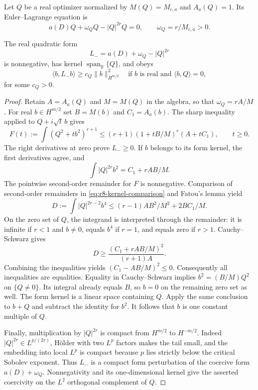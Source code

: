 Let $Q$ be a real optimizer normalized by $M(Q)=M_{c,a}$ and
$A_a(Q)=1$. Its Euler--Lagrange equation is
\[
 a(D)Q+\omega_QQ-|Q|^{2r}Q=0,\qquad
 \omega_Q=r/M_{c,a}>0.
\]

\begin{lemma}\label{lem:r8-phase-coercivity}
The real quadratic form
\[
 L_-=a(D)+\omega_Q-|Q|^{2r}
\]
is nonnegative, has kernel $\operatorname{span}_{\mathbb R}\{Q\}$,
and obeys
\[
 \langle b,L_-b\rangle\ge c_Q\|b\|_{H^{m/2}}^2
 \quad\text{if }b\text{ is real and }\langle b,Q\rangle=0,
\]
for some $c_Q>0$.
\end{lemma}
\begin{proof}
Retain $A=A_a(Q)$ and $M=M(Q)$ in the algebra, so that
$\omega_Q=rA/M$. For real $b\in H^{m/2}$ set
$B=M(b)$ and $C_1=A_a(b)$.
The sharp inequality applied to $Q+i\sqrt t\,b$ gives
\begin{equation}\label{eq:r8-kernel-comparison}
 F(t):=\int(Q^2+tb^2)^{r+1}
 \le(r+1)(1+tB/M)^r(A+tC_1),\qquad t\ge0.
\end{equation}
The right derivatives at zero prove $L_-\ge0$.
If $b$ belongs to its form kernel, the first derivatives agree, and
\[
 \int |Q|^{2r}b^2=C_1+rAB/M.
\]
The pointwise second-order remainder for $F$ is nonnegative.
Comparison of second-order remainders in
\eqref{eq:r8-kernel-comparison} and Fatou's lemma yield
\[
 D:=\int |Q|^{2r-2}b^4
 \le(r-1)AB^2/M^2+2BC_1/M.
\]
On the zero set of $Q$, the integrand is interpreted through
the remainder: it is infinite if $r<1$ and $b\ne0$, equals $b^4$
if $r=1$, and equals zero if $r>1$.
Cauchy--Schwarz gives
\[
 D\ge\frac{(C_1+rAB/M)^2}{(r+1)A}.
\]
Combining the inequalities yields
$(C_1-AB/M)^2\le0$. Consequently all inequalities are equalities.
Equality in Cauchy--Schwarz implies
$b^2=(B/M)Q^2$ on $\{Q\ne0\}$. Its integral already equals $B$,
so $b=0$ on the remaining zero set as well.
The form kernel is a linear space containing $Q$. Apply the same
conclusion to $b+Q$ and subtract the identity for $b^2$.
It follows that $b$ is one constant multiple of $Q$.

Finally, multiplication by $|Q|^{2r}$ is compact from $H^{m/2}$
to $H^{-m/2}$. Indeed $|Q|^{2r}\in L^{p/(2r)}$,
H\"older with two $L^p$ factors makes the tail small, and the
embedding into local $L^p$ is compact because $p$ lies strictly
below the critical Sobolev exponent. Thus $L_-$ is a compact
form perturbation of the coercive form $a(D)+\omega_Q$.
Nonnegativity and its one-dimensional kernel give the asserted
coercivity on the $L^2$ orthogonal complement of $Q$.
\end{proof}

